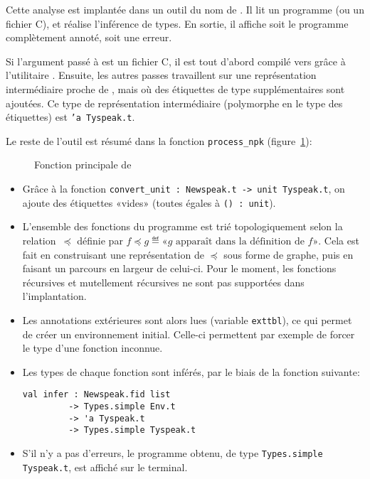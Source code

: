Cette analyse est implantée dans un outil du nom de \ptrtype{}. Il lit un
programme \newspeak (ou un fichier C), et réalise l'inférence de types. En
sortie, il affiche soit le programme complètement annoté, soit une erreur.

Si l'argument passé à \ptrtype{} est un fichier C, il est tout d'abord compilé
vers \newspeak grâce à l'utilitaire \ctonewspeak. Ensuite, les autres passes
travaillent sur une représentation intermédiaire proche de \newspeak, mais où
des étiquettes de type supplémentaires sont ajoutées. Ce type de représentation
intermédiaire (polymorphe en le type des étiquettes) est \texttt{'a Tyspeak.t}.

Le reste de l'outil est résumé dans la fonction
\texttt{process\_npk} (figure~\ref{fig:implem-process}):

\begin{figure}
\caption{Fonction principale de \ptrtype{}}
\label{fig:implem-process}
\end{figure}

\begin{itemize}

\item Grâce à la fonction \verb!convert_unit : Newspeak.t -> unit Tyspeak.t!,
  on ajoute des étiquettes «vides» (toutes égales à \verb!() : unit!).

\item L'ensemble des fonctions du programme est trié topologiquement selon la
  relation~$\preceq$ définie par $f \preceq g \eqdef \textrm{«} g
  \textrm{ apparaît dans la définition de } f \textrm{»}$. Cela est fait en
  construisant une représentation de $\preceq$ sous forme de graphe, puis en
  faisant un parcours en largeur de celui-ci. Pour le moment, les fonctions
  récursives et mutellement récursives ne sont pas supportées dans
  l'implantation.

\item Les annotations extérieures sont alors lues (variable \texttt{exttbl}), ce
  qui permet de créer un environnement initial. Celle-ci permettent par exemple
  de forcer le type d'une fonction inconnue.

\item Les types de chaque fonction sont inférés, par le biais de la fonction
  suivante:

\begin{Verbatim}
val infer : Newspeak.fid list
         -> Types.simple Env.t
         -> 'a Tyspeak.t
         -> Types.simple Tyspeak.t
\end{Verbatim}

\item S'il n'y a pas d'erreurs, le programme obtenu, de type
\texttt{Types.simple Tyspeak.t}, est affiché sur le terminal.

\end{itemize}

